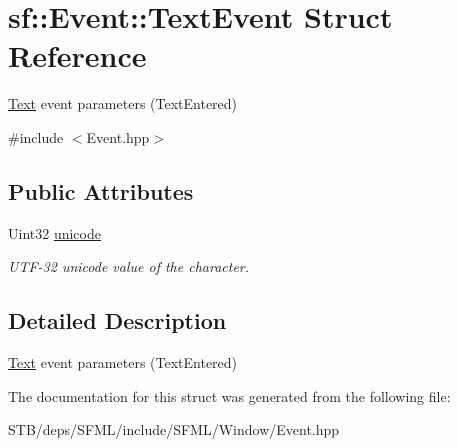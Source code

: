 \hypertarget{structsf_1_1_event_1_1_text_event}{\section{sf\+:\+:Event\+:\+:Text\+Event Struct Reference}
\label{structsf_1_1_event_1_1_text_event}
}


\hyperlink{classsf_1_1_text}{Text} event parameters (Text\+Entered)  




{\ttfamily \#include $<$Event.\+hpp$>$}

\subsection*{Public Attributes}
\begin{DoxyCompactItemize}
\item 
\hypertarget{structsf_1_1_event_1_1_text_event_a00d96b1a5328a1d7cbc276e161befcb0}{Uint32 \hyperlink{structsf_1_1_event_1_1_text_event_a00d96b1a5328a1d7cbc276e161befcb0}{unicode}}\label{structsf_1_1_event_1_1_text_event_a00d96b1a5328a1d7cbc276e161befcb0}

\begin{DoxyCompactList}\small\item\em U\+T\+F-\/32 unicode value of the character. \end{DoxyCompactList}\end{DoxyCompactItemize}


\subsection{Detailed Description}
\hyperlink{classsf_1_1_text}{Text} event parameters (Text\+Entered) 

The documentation for this struct was generated from the following file\+:\begin{DoxyCompactItemize}
\item 
S\+T\+B/deps/\+S\+F\+M\+L/include/\+S\+F\+M\+L/\+Window/Event.\+hpp\end{DoxyCompactItemize}
